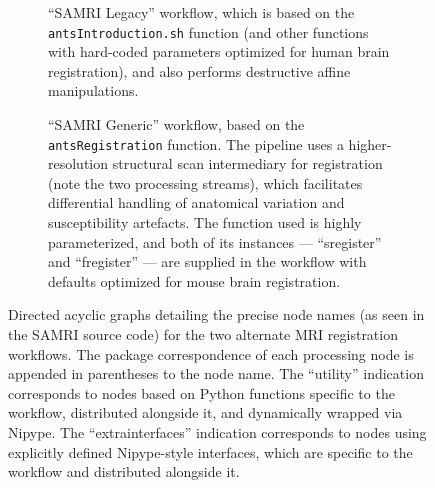 \begin{figure}[h!]
	\begin{subfigure}{.34\textwidth}
		\centering
		\vspace{-1.9em}
		\caption{
			“SAMRI Legacy” workflow, which is based on the \textcolor{mg}{\texttt{antsIntroduction.sh}} function (and other functions with hard-coded parameters optimized for human brain registration), and also performs destructive affine manipulations.
			}
		\label{fig:nwfgl}
	\end{subfigure}\hfill
	\begin{subfigure}{.64\textwidth}
		\centering
		\vspace{1.4em}
		\caption{
			“SAMRI Generic”  workflow, based on the \textcolor{mg}{\texttt{antsRegistration}} function.
			The pipeline uses a higher-resolution structural scan intermediary for registration (note the two processing streams), which facilitates differential handling of anatomical variation and susceptibility artefacts.
			The function used is highly parameterized, and both of its instances --- “s\niceus register” and “f\niceus register” --- are supplied in the workflow with defaults optimized for mouse brain registration.
			}
		\label{fig:nwfgg}
	\end{subfigure}
	\caption{
		Directed acyclic graphs detailing the precise node names (as seen in the SAMRI source code) for the two alternate MRI registration workflows.
		The package correspondence of each processing node is appended in parentheses to the node name.
		The “utility” indication corresponds to nodes based on Python functions specific to the workflow, distributed alongside it, and dynamically wrapped via Nipype.
		The “extra\niceus interfaces” indication corresponds to nodes using explicitly defined Nipype-style interfaces, which are specific to the workflow and distributed alongside it.
		}
	\label{fig:nwfg}
\end{figure}


